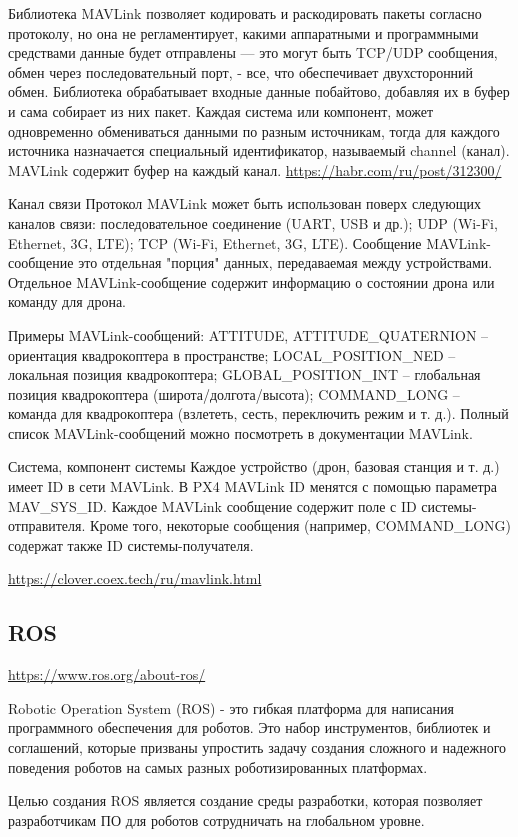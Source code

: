 Библиотека MAVLink позволяет кодировать и раскодировать пакеты согласно протоколу, но она не регламентирует, какими аппаратными и программными средствами данные будет отправлены — это могут быть TCP/UDP сообщения, обмен через последовательный порт, - все, что обеспечивает двухсторонний обмен. Библиотека обрабатывает входные данные побайтово, добавляя их в буфер и сама собирает из них пакет. Каждая система или компонент, может одновременно обмениваться данными по разным источникам, тогда для каждого источника назначается специальный идентификатор, называемый channel (канал). MAVLink содержит буфер на каждый канал.
\url{https://habr.com/ru/post/312300/}

Канал связи
Протокол MAVLink может быть использован поверх следующих каналов связи:
последовательное соединение (UART, USB и др.);
UDP (Wi-Fi, Ethernet, 3G, LTE);
TCP (Wi-Fi, Ethernet, 3G, LTE).
Сообщение
MAVLink-сообщение это отдельная "порция" данных, передаваемая между устройствами. Отдельное MAVLink-сообщение содержит информацию о состоянии дрона или команду для дрона.

Примеры MAVLink-сообщений:
ATTITUDE, ATTITUDE_QUATERNION – ориентация квадрокоптера в пространстве;
LOCAL_POSITION_NED – локальная позиция квадрокоптера;
GLOBAL_POSITION_INT – глобальная позиция квадрокоптера (широта/долгота/высота);
COMMAND_LONG – команда для квадрокоптера (взлететь, сесть, переключить режим и т. д.).
Полный список MAVLink-сообщений можно посмотреть в документации MAVLink.

Система, компонент системы
Каждое устройство (дрон, базовая станция и т. д.) имеет ID в сети MAVLink. В PX4 MAVLink ID менятся с помощью параметра MAV_SYS_ID. Каждое MAVLink сообщение содержит поле с ID системы-отправителя. Кроме того, некоторые сообщения (например, COMMAND_LONG) содержат также ID системы-получателя.

\url{https://clover.coex.tech/ru/mavlink.html}

\subsection{ROS}
\url{https://www.ros.org/about-ros/}

Robotic Operation System (ROS) - это гибкая платформа для написания программного обеспечения для роботов. Это набор инструментов, библиотек и соглашений, которые призваны упростить задачу создания сложного и надежного поведения роботов на самых разных роботизированных платформах.

Целью создания ROS является создание среды разработки, которая позволяет разработчикам ПО для роботов сотрудничать на глобальном уровне.

